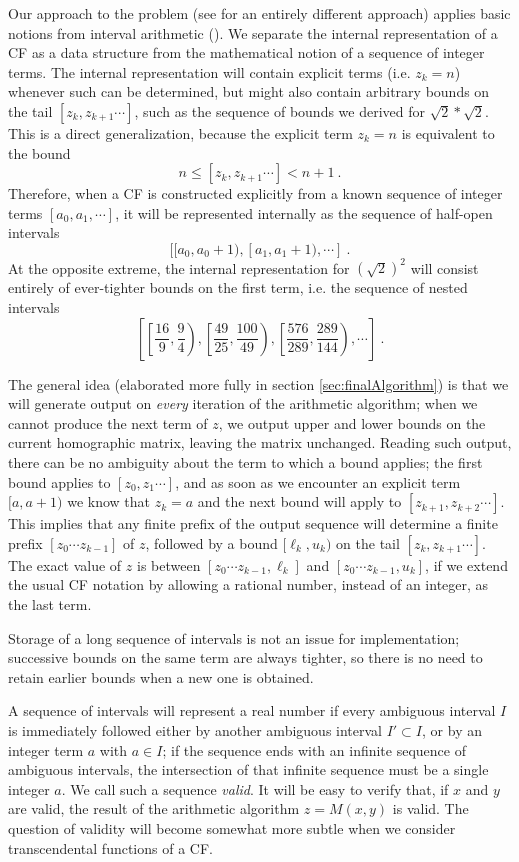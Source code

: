 \documentclass[11pt, oneside]{amsart}   	%
\renewcommand{\:}{\negthickspace:\negthickspace}
\begin{document}
Our approach to the problem (see \cite{Lester01} for an entirely different approach)
applies basic notions from interval arithmetic (\cite{doi:10.1137/1.9780898717716,Mayer+2017}).
We separate the internal representation of a CF as a data structure from the mathematical notion of a  sequence of integer terms. The
internal representation will contain explicit terms (i.e. $z_k=n$) whenever such can be determined, but might also contain arbitrary
bounds on the tail $[z_k, z_{k+1}\cdots]$, such as the  sequence of bounds we derived for $\sqrt{2}*\sqrt{2}$. This is a direct
generalization, because the explicit term  $z_k=n$ is equivalent to the bound 
\[
n \leq [z_k, z_{k+1}\cdots] < n+1 \ .
\]
Therefore, when a CF is constructed explicitly from a known sequence of integer terms $[a_0, a_1, \cdots]$,
it will be represented internally as the sequence of half-open intervals
\[
[[a_0, a_0+1),  [a_1, a_1+1), \cdots]\ .
\] 
At the opposite extreme, the internal representation for $(\sqrt{2})^2$ will consist entirely of ever-tighter bounds on the first term, i.e. the sequence of nested intervals
\[
\left[ \left[\frac{16}{9},\frac{9}{4}\right), \left[\frac{49}{25},\frac{100}{49}\right), \left[\frac{576}{289},\frac{289}{144}\right), \cdots\right ]\ .
\] 

The general idea (elaborated more fully in section \ref{sec:finalAlgorithm}) is that we will generate output on \emph{every}
 iteration of the arithmetic algorithm; when we cannot produce the next term of $z$, we output upper and lower bounds on the current
 homographic matrix, leaving the matrix unchanged. Reading such output, there can be no ambiguity about the term to which a bound 
 applies; the first bound applies to $[z_0,z_1\cdots]$, and as soon as we encounter an explicit term $[a,a+1)$ we know that $z_k=a$ and the next bound will apply to $[z_{k+1}, z_{k+2}\cdots]$. 
 This implies that any finite prefix of the output sequence will determine a finite prefix $[z_0 \cdots z_{k-1}]$ of $z$, followed by a bound
 $[\ell_k,u_k)$ on the tail $[z_k, z_{k+1}\cdots]$. The exact value of $z$ is between $[z_0 \cdots z_{k-1}, \ell_k]$ and
 $[z_0 \cdots z_{k-1}, u_k]$, if we extend the usual CF notation by allowing a rational number, instead of an integer, as the last term.

Storage of a long sequence of intervals is not an issue for implementation;
successive bounds on the same term are always tighter, so there is no need to retain earlier bounds when a new one is obtained.

A sequence of intervals will represent a real number if every ambiguous interval $I$ is immediately followed
either by another ambiguous interval $I' \subset I$, or by an integer term $a$ with $a \in I$;
if the sequence ends with an infinite sequence of ambiguous intervals, the intersection of that infinite sequence must be a single integer $a$.
We call such a sequence \emph{valid}.
It will be easy to verify that, if $x$ and $y$ are valid, the result of the arithmetic algorithm $z = M(x,y)$ is valid.
The question of validity will become somewhat more subtle when we consider transcendental functions of a CF.
\end{document}
